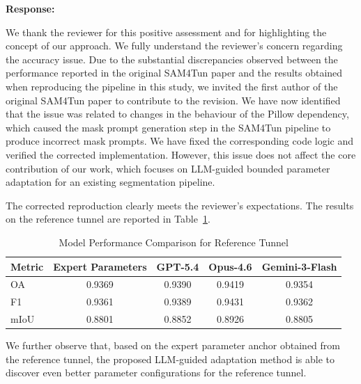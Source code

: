 \documentclass[11pt,a4paper]{article}
\newenvironment{responseblock}{%
  \par\smallskip\noindent\textbf{Response:}\par
  \begingroup\color{responsegreen}
}{%
  \endgroup\smallskip
}
\begin{document}
\begin{responseblock}

We thank the reviewer for this positive assessment and for highlighting the concept of our approach. We fully understand the reviewer’s concern regarding the accuracy issue. Due to the substantial discrepancies observed between the performance reported in the original SAM4Tun paper and the results obtained when reproducing the pipeline in this study, we invited the first author of the original SAM4Tun paper to contribute to the revision. We have now identified that the issue was related to changes in the behaviour of the Pillow dependency, which caused the mask prompt generation step in the SAM4Tun pipeline to produce incorrect mask prompts. We have fixed the corresponding code logic and verified the corrected implementation. However, this issue does not affect the core contribution of our work, which focuses on LLM-guided bounded parameter adaptation for an existing segmentation pipeline.

The corrected reproduction clearly meets the reviewer’s expectations. The results on the reference tunnel are reported in Table~\ref{tab:performance_r1}.

\begin{table}[htbp]
\centering
\caption{Model Performance Comparison for Reference Tunnel}
\label{tab:performance_r1}
\begingroup
\color{responsegreen}
\begin{tabular}{lcccc}
\toprule
\textbf{Metric} & \textbf{Expert Parameters} & \textbf{GPT-5.4} & \textbf{Opus-4.6} & \textbf{Gemini-3-Flash} \\ \midrule
OA      & 0.9369       & 0.9390      & 0.9419      & 0.9354           \\
F1      & 0.9361       & 0.9389      & 0.9431      & 0.9362           \\
mIoU    & 0.8801       & 0.8852      & 0.8926      & 0.8805           \\ \bottomrule
\end{tabular}
\endgroup
\end{table}

We further observe that, based on the expert parameter anchor obtained from the reference tunnel, the proposed LLM-guided adaptation method is able to discover even better parameter configurations for the reference tunnel.


\end{responseblock}
\end{document}
